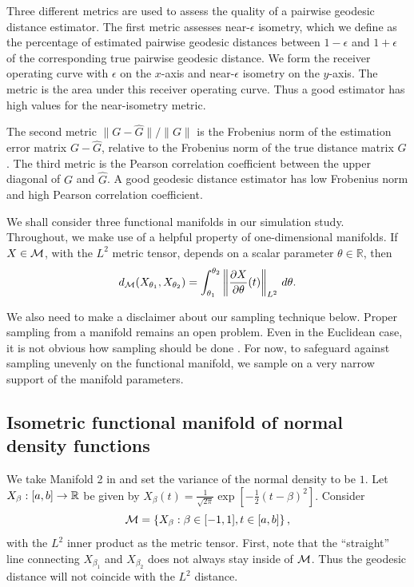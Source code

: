 Three different metrics are used to assess the quality of a pairwise
geodesic distance estimator. The first metric assesses near-\(\epsilon\)
isometry, which we define as the percentage of estimated pairwise
geodesic distances between \(1-\epsilon\) and \(1+\epsilon\) of the
corresponding true pairwise geodesic distance. We form the receiver
operating curve with \(\epsilon\) on the \(x\)-axis and
near-\(\epsilon\) isometry on the \(y\)-axis. The metric is the area
under this receiver operating curve. Thus a good estimator has high
values for the near-isometry metric.

The second metric \(\|G-\hat G\|/\|G\|\) is the Frobenius norm of the
estimation error matrix \(G-\hat G\), relative to the Frobenius norm of
the true distance matrix \(G\). The third metric is the Pearson
correlation coefficient between the upper diagonal of \(G\) and
\(\hat G\). A good geodesic distance estimator has low Frobenius norm
and high Pearson correlation coefficient.

We shall consider three functional manifolds in our simulation study.
Throughout, we make use of a helpful property of one-dimensional
manifolds. If \(X \in \mathcal{M}\), with the \(L^2\) metric tensor, depends on a
scalar parameter \(\theta \in \mathbb R\), then \[
d_{\mathcal{M}}(X_{\theta_1},X_{\theta_2}) = \int_{\theta_1}^{\theta_2} \left\| \frac{\partial X}{\partial \theta}(t)\right\|_{L^2} \,d\theta.
\]

We also need to make a disclaimer about our sampling technique below.
Proper sampling from a manifold remains an open problem. Even in the
Euclidean case, it is not obvious how sampling should be done
\cite{Diaconis2013}. For now, to safeguard against sampling unevenly on
the functional manifold, we sample on a very narrow support of the
manifold parameters.

\subsection{Isometric functional manifold of normal density
functions}\label{isometric-functional-manifold-of-normal-density-functions}

We take Manifold 2 in \cite{ChenMuller2012} and set the variance of the
normal density to be \(1\). Let \(X_\beta: [a,b] \to \mathbb{R}\) be given by
\(X_\beta(t) = \frac{1}{\sqrt{2\pi}} \exp{[-\frac{1}{2}(t-\beta)^2]}\).
Consider
\[\mathcal{M} = \left \{X_\beta: \beta \in [-1,1], t \in [a,b]\right \},\] with
the \(L^2\) inner product as the metric tensor. First, note that the
``straight'' line connecting \(X_{\beta_1}\) and \(X_{\beta_2}\) does
not always stay inside of \(\mathcal{M}\). Thus the geodesic distance will not
coincide with the \(L^2\) distance.

